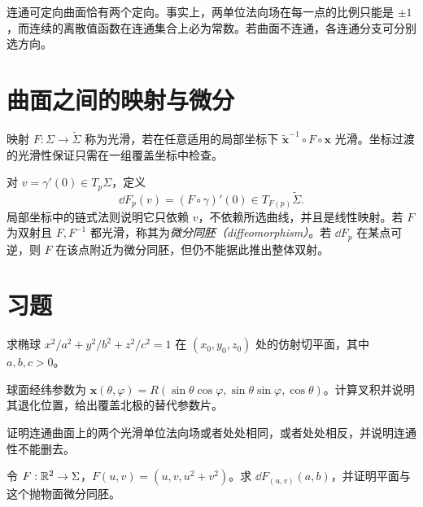 连通可定向曲面恰有两个定向。事实上，两单位法向场在每一点的比例只能是 $\pm1$，而连续的离散值函数在连通集合上必为常数。若曲面不连通，各连通分支可分别选方向。

\section{曲面之间的映射与微分}
映射 $F:\Sigma\to\widetilde\Sigma$ 称为光滑，若在任意适用的局部坐标下 $\widetilde{\mathbf x}^{-1}\circ F\circ\mathbf x$ 光滑。坐标过渡的光滑性保证只需在一组覆盖坐标中检查。

对 $v=\gamma'(0)\in T_p\Sigma$，定义
\[
 \dd F_p(v)=(F\circ\gamma)'(0)\in T_{F(p)}\widetilde\Sigma.
\]
局部坐标中的链式法则说明它只依赖 $v$，不依赖所选曲线，并且是线性映射。若 $F$ 为双射且 $F,F^{-1}$ 都光滑，称其为\emph{微分同胚（diffeomorphism）}。若 $\dd F_p$ 在某点可逆，则 $F$ 在该点附近为微分同胚，但仍不能据此推出整体双射。

\section{习题}
\begin{exercise}\label{ex:dg-surfaces-tangent}
求椭球 $x^2/a^2+y^2/b^2+z^2/c^2=1$ 在 $(x_0,y_0,z_0)$ 处的仿射切平面，其中 $a,b,c>0$。
\end{exercise}
\begin{exercise}\label{ex:dg-surfaces-chart}
球面经纬参数为 $\mathbf x(\theta,\varphi)=R(\sin\theta\cos\varphi,\sin\theta\sin\varphi,\cos\theta)$。计算叉积并说明其退化位置，给出覆盖北极的替代参数片。
\end{exercise}
\begin{exercise}\label{ex:dg-surfaces-orientation}
证明连通曲面上的两个光滑单位法向场或者处处相同，或者处处相反，并说明连通性不能删去。
\end{exercise}
\begin{exercise}\label{ex:dg-surfaces-differential}
令 $F:\mathbb R^2\to\Sigma$，$F(u,v)=(u,v,u^2+v^2)$。求 $\dd F_{(u,v)}(a,b)$，并证明平面与这个抛物面微分同胚。
\end{exercise}

